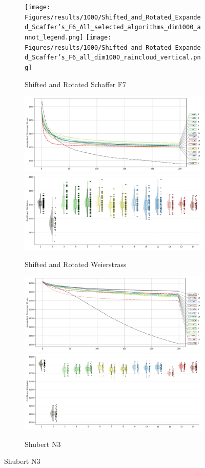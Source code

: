 \begin{figure}[p]\ContinuedFloat
\renewcommand\thesubfigure{C.\arabic{figure}.\arabic{subfigure}} %
    \centering

\begin{subfigure}{1\textwidth}
    \centering
    \texttt{[image: Figures/results/1000/Shifted\_and\_Rotated\_Expanded\_Scaffer’s\_F6\_All\_selected\_algorithms\_dim1000\_annot\_legend.png]}
    \texttt{[image: Figures/results/1000/Shifted\_and\_Rotated\_Expanded\_Scaffer’s\_F6\_all\_dim1000\_raincloud\_vertical.png]}
    \caption{Shifted and Rotated Schaffer F7}
\end{subfigure}

\begin{subfigure}{1\textwidth}
    \centering
    \includegraphics[width=.49\textwidth]{Figures/results/1000/Shifted_and_Rotated_Weierstrass_All_selected_algorithms_dim1000_annot_legend.png}
    \includegraphics[width=.49\textwidth]{Figures/results/1000/Shifted_and_Rotated_Weierstrass_all_dim1000_raincloud_vertical.png}
    \caption{Shifted and Rotated Weierstrass}
\end{subfigure}

\begin{subfigure}{1\textwidth}
    \centering
    \includegraphics[width=.49\textwidth]{Figures/results/1000/Shubert_N3_All_selected_algorithms_dim1000_annot_legend.png}
    \includegraphics[width=.49\textwidth]{Figures/results/1000/Shubert_N3_all_dim1000_raincloud_vertical.png}
    \caption{Shubert N3}
\end{subfigure}


\end{figure}
